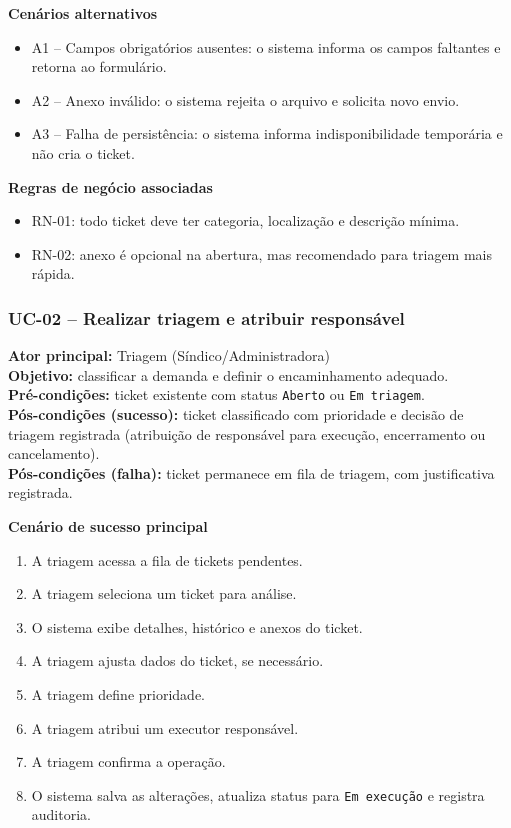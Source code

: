 \documentclass[12pt,a4paper]{article}
\begin{document}
\textbf{Cenários alternativos}
\begin{itemize}
    \item A1 -- Campos obrigatórios ausentes: o sistema informa os campos faltantes e retorna ao formulário.
    \item A2 -- Anexo inválido: o sistema rejeita o arquivo e solicita novo envio.
    \item A3 -- Falha de persistência: o sistema informa indisponibilidade temporária e não cria o ticket.
\end{itemize}

\textbf{Regras de negócio associadas}
\begin{itemize}
    \item RN-01: todo ticket deve ter categoria, localização e descrição mínima.
    \item RN-02: anexo é opcional na abertura, mas recomendado para triagem mais rápida.
\end{itemize}

\subsubsection{UC-02 -- Realizar triagem e atribuir responsável}

\textbf{Ator principal:} Triagem (Síndico/Administradora) \\
\textbf{Objetivo:} classificar a demanda e definir o encaminhamento adequado. \\
\textbf{Pré-condições:} ticket existente com status \texttt{Aberto} ou \texttt{Em triagem}. \\
\textbf{Pós-condições (sucesso):} ticket classificado com prioridade e decisão de triagem registrada (atribuição de responsável para execução, encerramento ou cancelamento). \\
\textbf{Pós-condições (falha):} ticket permanece em fila de triagem, com justificativa registrada.

\textbf{Cenário de sucesso principal}
\begin{enumerate}
    \item A triagem acessa a fila de tickets pendentes.
    \item A triagem seleciona um ticket para análise.
    \item O sistema exibe detalhes, histórico e anexos do ticket.
    \item A triagem ajusta dados do ticket, se necessário.
    \item A triagem define prioridade.
    \item A triagem atribui um executor responsável.
    \item A triagem confirma a operação.
    \item O sistema salva as alterações, atualiza status para \texttt{Em execução} e registra auditoria.
\end{enumerate}
\end{document}
